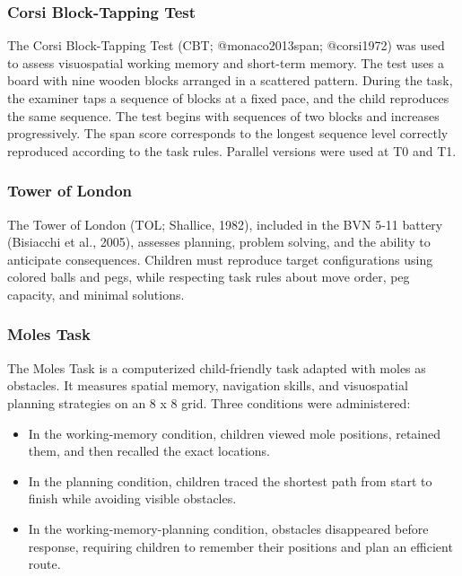 \documentclass[
  letterpaper,
  DIV=11,
  numbers=noendperiod]{scrartcl}
\providecommand{\tightlist}{%
  \setlength{\itemsep}{0pt}\setlength{\parskip}{0pt}}
\begin{document}
\subsubsection{Corsi Block-Tapping Test}\label{corsi-block-tapping-test}

The Corsi Block-Tapping Test (CBT; @monaco2013span; @corsi1972) was used
to assess visuospatial working memory and short-term memory. The test
uses a board with nine wooden blocks arranged in a scattered pattern.
During the task, the examiner taps a sequence of blocks at a fixed pace,
and the child reproduces the same sequence. The test begins with
sequences of two blocks and increases progressively. The span score
corresponds to the longest sequence level correctly reproduced according
to the task rules. Parallel versions were used at T0 and T1.

\subsubsection{Tower of London}\label{tower-of-london}

The Tower of London (TOL; Shallice, 1982), included in the BVN 5-11
battery (Bisiacchi et al., 2005), assesses planning, problem solving,
and the ability to anticipate consequences. Children must reproduce
target configurations using colored balls and pegs, while respecting
task rules about move order, peg capacity, and minimal solutions.

\subsubsection{Moles Task}\label{moles-task}

The Moles Task is a computerized child-friendly task adapted with moles
as obstacles. It measures spatial memory, navigation skills, and
visuospatial planning strategies on an 8 x 8 grid. Three conditions were
administered:

\begin{itemize}
\tightlist
\item
  In the working-memory condition, children viewed mole positions,
  retained them, and then recalled the exact locations.
\item
  In the planning condition, children traced the shortest path from
  start to finish while avoiding visible obstacles.
\item
  In the working-memory-planning condition, obstacles disappeared before
  response, requiring children to remember their positions and plan an
  efficient route.
\end{itemize}
\end{document}
